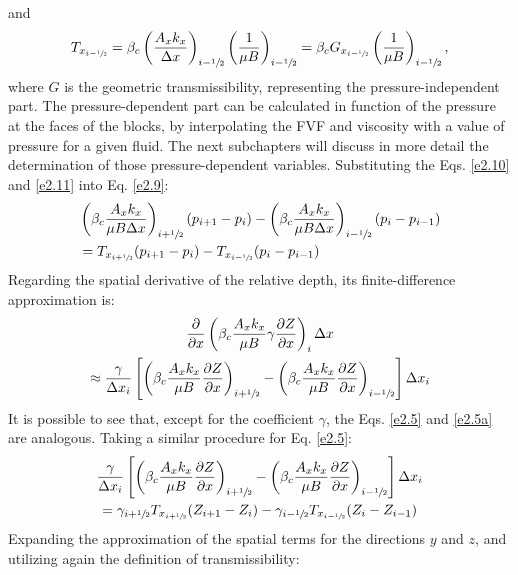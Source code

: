 and
\begin{align}
\label{e2.16}
T_{x_{i-\sfrac{1}{2}}}=\beta_c\left(\frac{A_x k_x}{\Delta x}\right)_{i-\sfrac{1}{2}} \left(\frac{1}{\mu B}\right)_{i-\sfrac{1}{2}}=\beta_c G_{x_{i-\sfrac{1}{2}}} \left(\frac{1}{\mu B}\right)_{i-\sfrac{1}{2}} ,
\end{align}
where $G$ is the geometric transmissibility, representing the pressure-independent part. The pressure-dependent part can be calculated in function of the pressure at the faces of the blocks, by interpolating the FVF and viscosity with a value of pressure for a given fluid. The next subchapters will discuss in more detail the determination of those pressure-dependent variables. Substituting the Eqs. \ref{e2.10} and \ref{e2.11} into Eq. \ref{e2.9}:
	\begin{align}\nonumber
	\label{e2.13}
	&\left( \beta_c \frac{A_x k_x}{\mu B \Delta x}\right)_{i+\sfrac{1}{2}} (p_{i+1}-p_i) - \left( \beta_c \frac{A_x k_x}{\mu B \Delta x}\right)_{i-\sfrac{1}{2}} (p_i-p_{i-1})\\ &= T_{x_{i+\sfrac{1}{2}}} (p_{i+1}-p_i) - T_{x_{i-\sfrac{1}{2}}} (p_i-p_{i-1})
	\end{align}
Regarding the spatial derivative of the relative depth, its finite-difference approximation is:
	\begin{multline}
	\label{e2.5a}
	\frac{\partial}{\partial x}\left( \beta_c \frac{A_x k_x}{\mu B}\gamma\frac{\partial Z}{\partial x}\right)_i \Delta x \\ \approx \frac{\gamma}{\Delta x_i} \left[ \left( \beta_c \frac{A_x k_x}{\mu B}\frac{\partial Z}{\partial x}\right)_{i+\sfrac{1}{2}} - \left( \beta_c \frac{A_x k_x}{\mu B}\frac{\partial Z}{\partial x}\right)_{i-\sfrac{1}{2}}\right] \Delta x_i
	\end{multline}
It is possible to see that, except for the coefficient $\gamma$, the Eqs. \ref{e2.5} and \ref{e2.5a} are analogous. Taking a similar procedure for Eq. \ref{e2.5}:
	\begin{multline}
	\label{e2.13a}
	\frac{\gamma}{\Delta x_i} \left[ \left( \beta_c \frac{A_x k_x}{\mu B}\frac{\partial Z}{\partial x}\right)_{i+\sfrac{1}{2}} - \left( \beta_c \frac{A_x k_x}{\mu B}\frac{\partial Z}{\partial x}\right)_{i-\sfrac{1}{2}}\right] \Delta x_i \\ =  \gamma_{i+\sfrac{1}{2}} T_{x_{i+\sfrac{1}{2}}} (Z_{i+1}-Z_i) - \gamma_{i-\sfrac{1}{2}} T_{x_{i-\sfrac{1}{2}}} (Z_i-Z_{i-1})
	\end{multline}
Expanding the approximation of the spatial terms for the directions $y$ and $z$, and utilizing again the definition of transmissibility:
